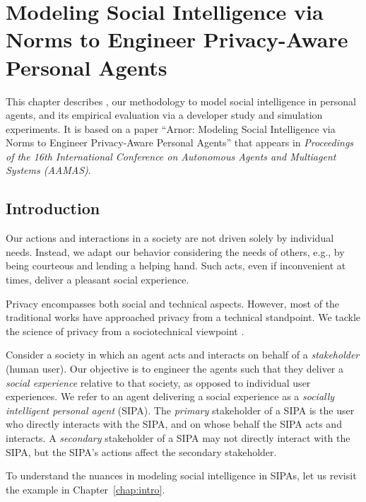 \chapter[Modeling Social Intelligence via Norms]{Modeling Social Intelligence via Norms to Engineer Privacy-Aware Personal Agents}
\label{chap:arnor}

This chapter describes \frameworkA, our methodology to model social
intelligence in personal agents, and its empirical evaluation via a
developer study and simulation experiments. It is based on a
paper ``Arnor: Modeling Social Intelligence via Norms to Engineer
Privacy-Aware Personal Agents'' that appears in \emph{Proceedings of the
16th International Conference on Autonomous Agents and Multiagent
Systems (AAMAS)}.

\section{Introduction}
\label{sec:arnor-intro}

Our actions and interactions in a society are not driven solely by
individual needs. Instead, we adapt our behavior considering the needs
of others, e.g., by being courteous and lending a helping hand. Such
acts, even if inconvenient at times, deliver a pleasant social
experience.

Privacy encompasses both social and technical aspects. However, most of
the traditional works have approached privacy from a technical
standpoint. We tackle the science of privacy from a sociotechnical
viewpoint \citep{Kafali-IS16-Revani,WWW-16:IOSE}.

Consider a society in which an agent acts and interacts on behalf of a
\emph{stakeholder} (human user). Our objective is to engineer the agents
such that they deliver a \emph{social experience} relative to that
society, as opposed to individual user experiences. We refer to an agent
delivering a social experience as a \emph{socially intelligent personal
agent} (SIPA). The \emph{primary} stakeholder of a SIPA is the user who
directly interacts with the SIPA, and on whose behalf the SIPA acts and
interacts. A \emph{secondary} stakeholder of a SIPA may not directly
interact with the SIPA, but the SIPA's actions affect the secondary
stakeholder.

To understand the nuances in modeling social intelligence in SIPAs, 
let us revisit the example in Chapter~\ref{chap:intro}. 

